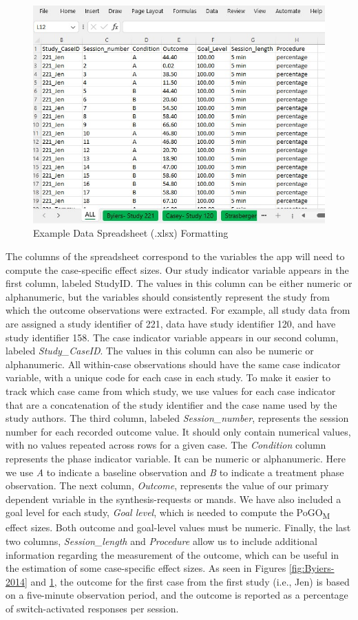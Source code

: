 \documentclass[
]{book}
\begin{document}
\begin{figure}
\includegraphics[width=0.6\linewidth]{images/excel_multistudy} \caption{Example Data Spreadsheet (.xlsx) Formatting}\label{fig:multistudy-example-data}
\end{figure}

The columns of the spreadsheet correspond to the variables the app will need to compute the case-specific effect sizes. Our study indicator variable appears in the first column, labeled StudyID. The values in this column can be either numeric or alphanumeric, but the variables should consistently represent the study from which the outcome observations were extracted. For example, all study data from \citet{Byiers2014} are assigned a study identifier of 221, \citet{Casey1978} data have study identifier 120, and \citet{StrasbergerFerreri2014} have study identifier 158. The case indicator variable appears in our second column, labeled \emph{Study\_CaseID}. The values in this column can also be numeric or alphanumeric. All within-case observations should have the same case indicator variable, with a unique code for each case in each study. To make it easier to track which case came from which study, we use values for each case indicator that are a concatenation of the study identifier and the case name used by the study authors. The third column, labeled \emph{Session\_number}, represents the session number for each recorded outcome value. It should only contain numerical values, with no values repeated across rows for a given case. The \emph{Condition} column represents the phase indicator variable. It can be numeric or alphanumeric. Here we use \emph{A} to indicate a baseline observation and \emph{B} to indicate a treatment phase observation. The next column, \emph{Outcome}, represents the value of our primary dependent variable in the synthesis-requests or mands. We have also included a goal level for each study, \emph{Goal level}, which is needed to compute the PoGO\textsubscript{M} effect sizes. Both outcome and goal-level values must be numeric. Finally, the last two columns, \emph{Session\_length} and \emph{Procedure} allow us to include additional information regarding the measurement of the outcome, which can be useful in the estimation of some case-specific effect sizes. As seen in Figures \ref{fig:Byiers-2014} and \ref{fig:multistudy-example-data}, the outcome for the first case from the first study (i.e., Jen) is based on a five-minute observation period, and the outcome is reported as a percentage of switch-activated responses per session.
\end{document}
